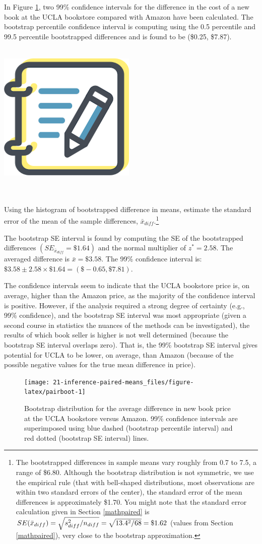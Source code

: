 \documentclass[
  10pt,
  openany]{book}
\newenvironment{mdframedwithfootGPWE}
{   
    \savenotes
    \begin{mdframed}[%
    topline=true, bottomline=true, linecolor=oiB, linewidth=0.5pt,
    rightline=false, leftline=false,
    backgroundcolor=oiLGray]
    \renewcommand{\thempfootnote}{\arabic{footnote}}
    }
{
    \end{mdframed}
    \spewnotes
}
\newenvironment{guidedpractice}{
\vspace{4mm}
\begin{mdframedwithfootGPWE}
\begin{minipage}[t]{0.10\textwidth}
{$\:$ \\ \setkeys{Gin}{width=2.5em,keepaspectratio}\includegraphics{images/_icons/guided-practice.png}}
\end{minipage}
\hfill
\begin{minipage}[t]{0.90\textwidth}
\vspace{-2mm}
\setlength{\parskip}{1em}
\noindent\textbf{\color{oiB}\small\fontfamily{phv}\selectfont{\MakeUppercase{Guided Practice}}} $\:$ \\ \\
}{\end{minipage}
\end{mdframedwithfootGPWE}
\vspace{4mm}
}
\begin{document}
In Figure \ref{fig:pairboot}, two 99\% confidence intervals for the difference in the cost of a new book at the UCLA bookstore compared with Amazon have been calculated.
The bootstrap percentile confidence interval is computing using the 0.5 percentile and 99.5 percentile bootstrapped differences and is found to be (\$0.25, \$7.87).

\begin{guidedpractice}
Using the histogram of bootstrapped difference in means, estimate the standard error of the mean of the sample differences, \(\bar{x}_{diff}.\)\footnote{The bootstrapped differences in sample means vary roughly from 0.7 to 7.5, a range of \$6.80.
  Although the bootstrap distribution is not symmetric, we use the empirical rule (that with bell-shaped distributions, most observations are within two standard errors of the center), the standard error of the mean differences is approximately \$1.70.
  You might note that the standard error calculation given in Section \ref{mathpaired} is \(SE(\bar{x}_{diff}) = \sqrt{s^2_{diff}/n_{diff}}\\ = \sqrt{13.4^2/68} = \$1.62\) (values from Section \ref{mathpaired}), very close to the bootstrap approximation.}

\end{guidedpractice}

The bootstrap SE interval is found by computing the SE of the bootstrapped differences \((SE_{\overline{x}_{diff}} = \$1.64)\) and the normal multiplier of \(z^* = 2.58.\) The averaged difference is \(\bar{x} = \$3.58.\) The 99\% confidence interval is: \(\$3.58 \pm 2.58 \times \$ 1.64 = (\$-0.65, \$7.81).\)

The confidence intervals seem to indicate that the UCLA bookstore price is, on average, higher than the Amazon price, as the majority of the confidence interval is positive.
However, if the analysis required a strong degree of certainty (e.g., 99\% confidence), and the bootstrap SE interval was most appropriate (given a second course in statistics the nuances of the methods can be investigated), the results of which book seller is higher is not well determined (because the bootstrap SE interval overlaps zero).
That is, the 99\% bootstrap SE interval gives potential for UCLA to be lower, on average, than Amazon (because of the possible negative values for the true mean difference in price).

\begin{figure}[h]

{\centering \texttt{[image: 21-inference-paired-means\_files/figure-latex/pairboot-1]} 

}

\caption{Bootstrap distribution for the average difference in new book price at the UCLA bookstore versus Amazon. 99\% confidence intervals are superimposed using blue dashed (bootstrap percentile interval) and red dotted (bootstrap SE interval) lines.}\label{fig:pairboot}
\end{figure}
\end{document}

